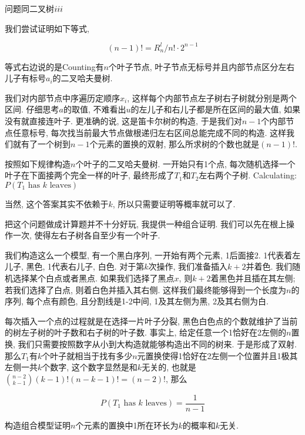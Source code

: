 	\begin{prob} [二叉树$\uppercase\expandafter{\romannumeral3}$另解]
	
		问题同二叉树$\uppercase\expandafter{\romannumeral3}$
		
		\sol
		我们尝试证明如下等式, 
		
		\begin{equation*}
			(n - 1)! = R_n^l / n! \cdot 2^{n - 1}
		\end{equation*}
		
		等式右边说的是Counting有$n$个叶子节点, 叶子节点无标号并且内部节点区分左右儿子有标号$a_i$的二叉哈夫曼树.
		
		我们对内部节点中序遍历定顺序$x_i$, 这样每个内部节点左子树右子树就分别是两个区间. 仔细思考$a$的取值, 不难看出$u$的左儿子和右儿子都是所在区间的最大值, 如果没有就直接连叶子. 更准确的说, 这是笛卡尔树的构造, 于是我们对$n - 1$个内部节点任意标号, 每次找当前最大节点做根递归左右区间总能完成不同的构造. 这样我们就有了一个树到$n - 1$个元素的置换的双射, 那么所求树的个数也就是$(n - 1)!$.
	
	\end{prob}

	\begin{prob} [二叉树$\uppercase\expandafter{\romannumeral5}$]
		
		按照如下规律构造$n$个叶子的二叉哈夫曼树. 一开始只有1个点, 每次随机选择一个叶子在下面接两个完全一样的叶子, 最终形成了$T_1$和$T_2$左右两个子树. Calculating: $P(T_1 \text{ has } k \text{ leaves})$
		
		当然, 这个答案其实不依赖于$k$, 所以只需要证明等概率就可以了.
		
		\sol
		
		把这个问题做成计算题并不十分好玩, 我提供一种组合证明. 我们可以先在根上操作一次, 使得左右子树各自至少有一个叶子.
		
		我们构造这么一个模型, 有一个黑白序列, 一开始有两个元素, 1后面接2. 1代表着左儿子, 黑色, 1代表右儿子, 白色. 对于第$k$次操作, 我们准备插入$k + 2$并着色. 我们随机选择某个白点或者黑点. 如果我们选择了黑点$x$, 则$k + 2$着黑色并且插在其左侧; 若我们选择了白点, 则着白色并插入其右侧. 这样我们最终能够得到一个长度为$n$的序列, 每个点有颜色, 且分割线是1-2中间, 1及其左侧为黑, 2及其右侧为白. 
		
		每次插入一个点的过程就是在选择一片叶子分裂, 黑色白色点的个数就维护了当前的树左子树的叶子数和右子树的叶子数. 事实上, 给定任意一个1恰好在2左侧的$n$置换, 我们只需要按照数字从小到大构造就能够构造出不同的树来. 于是形成了双射. 那么$T_1$有$k$个叶子就相当于找有多少$n$元置换使得1恰好在2左侧一个位置并且1极其左侧一共$k$个数字, 这个数字显然是和$k$无关的, 也就是$\binom{n - 2}{k - 1} (k - 1)! (n - k - 1)! = (n - 2)!$, 那么
		
		\begin{equation*}
			P(T_1 \text{ has } k \text{ leaves}) = \dfrac{1}{n - 1}
		\end{equation*}
		
	\end{prob}

	\begin{home}
		构造组合模型证明$n$个元素的置换中1所在环长为$k$的概率和$k$无关.
	\end{home}

